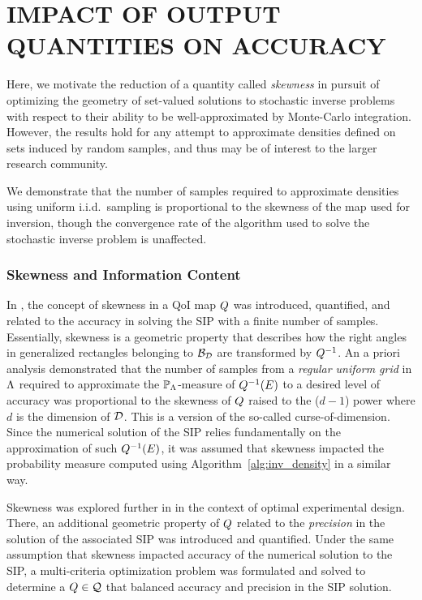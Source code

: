 \chapter{\uppercase{Impact of Output Quantities on Accuracy} \label{chapter:03}}

Here, we motivate the reduction of a quantity called \emph{skewness} in pursuit of optimizing the geometry of set-valued solutions to stochastic inverse problems with respect to their ability to be well-approximated by Monte-Carlo integration. 
However, the results hold for any attempt to approximate densities defined on sets induced by random samples, and thus may be of interest to the larger research community. 

We demonstrate that the number of samples required to approximate densities using uniform i.i.d.~sampling is proportional to the skewness of the map used for inversion, though the convergence rate of the algorithm used to solve the stochastic inverse problem is unaffected. 


\subsection{Skewness and Information Content}\label{sec:skewness}
In \cite{BGE+15}, the concept of skewness in a QoI map $Q$ was introduced, quantified, and related to the accuracy in solving the SIP with a finite number of samples.
Essentially, skewness is a geometric property that describes how the right angles in generalized rectangles belonging to $\mathcal{B}_{\mathcal{D}}$ are transformed by $Q^{-1}$. 
An a priori analysis demonstrated that the number of samples from a {\em regular uniform grid} in ${\Lambda}$ required to approximate the $\mathbb{P}_{\Lambda}$-measure of $Q^{-1}(E)$ to a desired level of accuracy was proportional to the skewness of $Q$ raised to the ($d-1$) power where $d$ is the dimension of $\mathcal{D}$.
This is a version of the so-called curse-of-dimension.
Since the numerical solution of the SIP relies fundamentally on the approximation of such $Q^{-1}(E)$, it was assumed that skewness impacted the probability measure computed using Algorithm~\ref{alg:inv_density} in a similar way.

Skewness was explored further in \cite{BPW17} in the context of optimal experimental design.
There, an additional geometric property of $Q$ related to the {\em precision} in the solution of the associated SIP was introduced and quantified. 
Under the same assumption that skewness impacted accuracy of the numerical solution to the SIP, a multi-criteria optimization problem was formulated and solved to determine a $Q\in\mathcal{Q}$ that balanced accuracy and precision in the SIP solution.

